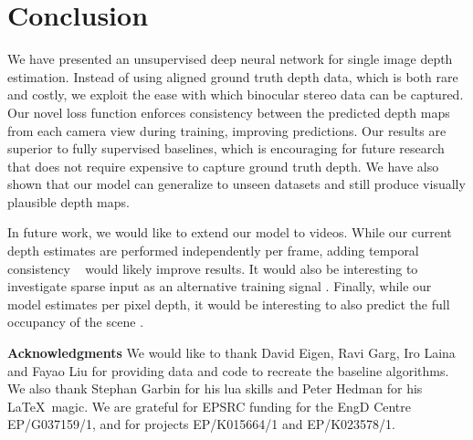 \documentclass[10pt,twocolumn,letterpaper]{article}
\begin{document}
\section{Conclusion}
We have presented an unsupervised deep neural network for single image depth estimation. 
Instead of using aligned ground truth depth data, which is both rare and costly, we exploit the ease with which binocular stereo data can be captured.
Our novel loss function enforces consistency between the predicted depth maps from each camera view during training, improving predictions. 
Our results are superior to fully supervised baselines, which is encouraging for future research that does not require expensive to capture ground truth depth. 
We have also shown that our model can generalize to unseen datasets and still produce visually plausible depth maps.

In future work, we would like to extend our model to videos.
While our current depth estimates are performed independently per frame, adding temporal consistency ~\cite{karsch2014depth} would likely improve results.
It would also be interesting to investigate sparse input as an alternative training signal \cite{zoran2015learning, chen2016single}. 
Finally, while our model estimates per pixel depth, it would be interesting to also predict the full occupancy of the scene \cite{FirmanCVPR2016}.

\small{
\vspace{8pt}
\noindent\textbf{Acknowledgments} We would like to thank David Eigen, Ravi Garg, Iro Laina and Fayao Liu for providing data and code to recreate the baseline algorithms. We also thank Stephan Garbin for his lua skills and Peter Hedman for his \LaTeX~magic. We are grateful for EPSRC funding for the EngD Centre EP/G037159/1, and for projects EP/K015664/1 and EP/K023578/1.
}

{\small 

}

\clearpage

\clearpage

\clearpage

\clearpage

\end{document}
